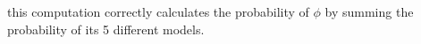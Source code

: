 \noindent this computation correctly calculates the probability of $\phi$ by summing the probability of its 5 different models.





